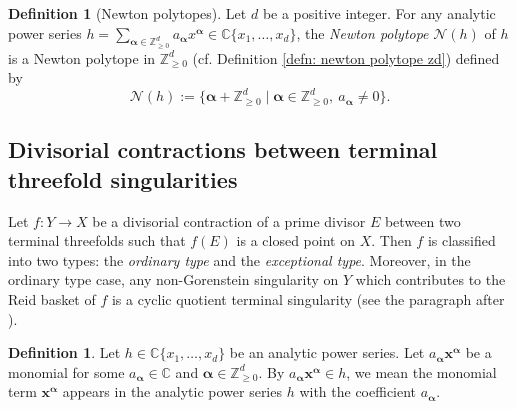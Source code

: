 \documentclass[11pt]{amsart}
\numberwithin{equation}{section}
\newcommand{\Cc}{\mathbb{C}}
\newcommand{\Zz}{\mathbb{Z}}
\theoremstyle{definition}
\theoremstyle{definition}
\newtheorem{defn}[thm]{Definition}
\begin{document}
\begin{defn}[Newton polytopes]
Let $d$ be a positive integer. For any analytic power series $h=\sum_{\bm{\alpha}\in\Zz_{\geq 0}^d} a_{\bm{\alpha}}x^{\bm{\alpha}}\in\mathbb C\{x_1,\dots,x_d\}$, the \emph{Newton polytope} $\mathcal{N}(h)$ of $h$ is a Newton polytope in $\mathbb Z^d_{\ge 0}$ (cf. Definition \ref{defn: newton polytope zd}) defined by 
$$\mathcal{N}(h):=\{\bm{\alpha}+\mathbb Z^d_{\ge 0}\mid \bm{\alpha}\in\mathbb Z^d_{\ge 0},~a_{\bm{\alpha}}\not=0\}.$$
\end{defn}

\subsection{Divisorial contractions between terminal threefold singularities} Let $f: Y\to X$ be a divisorial contraction of a prime divisor $E$ between two terminal threefolds such that $f(E)$ is a closed point on $X$. Then $f$ is classified into two types: the \emph{ordinary type} and the \emph{exceptional type}. Moreover, in the ordinary type case, any non-Gorenstein singularity
on $Y$ which contributes to the Reid basket of $f$ is a cyclic quotient terminal singularity (see the paragraph after \cite[Theorem~1.1]{Kaw05}).



\begin{defn}\label{defn: powerseries contains a monomial term notation}
Let $h\in\Cc\{x_1,\dots,x_d\}$ be an analytic power series. Let $a_{\bm{\alpha}}\bm{x}^{\bm{\alpha}}$ be a monomial for some $a_{\bm{\alpha}}\in \Cc$ and $\bm{\alpha}\in \Zz^d_{\geq 0}$. By $a_{\bm{\alpha}}\bm{x}^{\bm{\alpha}}\in h$, we mean the monomial term $\bm{x}^{\bm{\alpha}}$ appears in the analytic power series $h$ with the coefficient $a_{\bm{\alpha}}$.
\end{defn}
\end{document}
